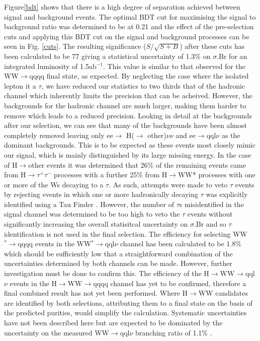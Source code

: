 Figure\ref{bdt} shows that there is a high degree of separation achieved between signal and background events. The optimal BDT cut for maximising the signal to background ratio was determined to be at 0.21 and the effect of the pre-selection cuts and applying this BDT cut on the signal and background processes can be seen in Fig. \ref{cuts}. The resulting significance ($S/\sqrt{S+B}$) after these cuts has been calculated to be 77 giving a statistical uncertainty of 1.3\% on $\sigma.$Br for an integrated luminosity of 1.5ab$^{-1}$. This value is similar to that observed for the WW$\rightarrow$qqqq final state, as expected. By neglecting the case where the isolated lepton it a $\tau$, we have reduced our statistics to two thirds that of the hadronic channel which inherently limits the precision that can be acheived. However, the backgrounds for the hadronic channel are much larger, making them harder to remove which leads to a reduced precision. Looking in detail at the backgrounds after our selection, we can see that many of the backgrounds have been almost completely removed leaving only ee$\rightarrow$ H($\rightarrow$ other)$\nu\nu$ and ee$\rightarrow$qql$\nu$ as the dominant backgrounds. This is to be expected as these events most closely mimic our signal, which is mainly distinguished by its large missing energy. In the case of H$\rightarrow$other events it was determined that 26\% of the remaining events came from H$\rightarrow\tau^+\tau^-$ processes with a further 25\% from H$\rightarrow$WW* processes with one or more of the Ws decaying to a $\tau$. As such, attempts were made to veto $\tau$ events by rejecting events in which one or more hadronically decaying $\tau$ was explicitly identified using a Tau Finder \cite{TauFinder}. However, the number of $\tau$s misidentified in the signal channel was determined to be too high to veto the $\tau$ events without significantly increasing the overall statisitcal uncertainty on $\sigma.$Br and so $\tau$ identification is not used in the final selection.
The efficiency for selecting WW$^*\rightarrow$qqqq events in the WW$^*\rightarrow$qql$\nu$ channel has been calculated to be 1.8\% which should be sufficiently low that a straightforward combination of the uncertainties determined by both channels can be made. However, further investigation must be done to confirm this. The efficiency of the H$\rightarrow$WW$\rightarrow$qql$\nu$ events in the H$\rightarrow$WW$\rightarrow$qqqq channel has yet to be confirmed, therefore a final combined result has not yet been performed. Where H$\rightarrow$WW candidates are identified by both selections, attributing them to a final state on the basis of the predicted purities, would simplify the calculation. Systematic uncertainties have not been described here but are expected to be dominated by the uncertainty on the measured WW$\rightarrow$qql$\nu$ branching ratio of 1.1\% \cite{Agashe:2014kda}. 

